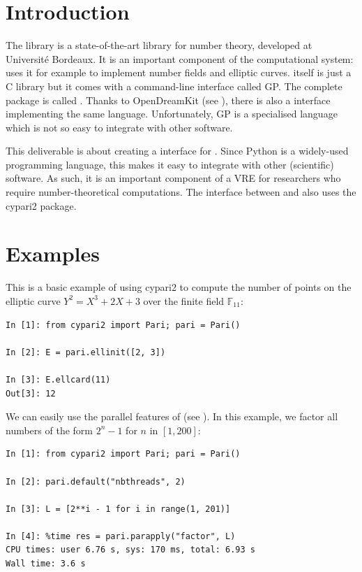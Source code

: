 \documentclass{deliverablereport}
\author{Jeroen Demeyer}
\begin{document}
\maketitle
\tableofcontents


\section{Introduction}

The \Pari library is a state-of-the-art library for number theory,
developed at Universit\'e Bordeaux.
It is an important component of the \Sage computational system:
\Sage uses it for example to implement number fields and elliptic curves.
\Pari itself is just a C library but it comes with a command-line interface called GP.
The complete package is called \PariGP.
Thanks to OpenDreamKit (see ),
there is also a \Jupyter interface implementing the same language.
Unfortunately, GP is a specialised language which is not so easy
to integrate with other software.

This deliverable is about creating a \Python interface for \PariGP.
Since Python is a widely-used programming language,
this makes it easy to integrate \PariGP with other (scientific) software.
As such, it is an important component of a VRE
for researchers who require number-theoretical computations.
The interface between \Sage and \PariGP also uses the cypari2 package.

\clearpage
\section{Examples}

This is a basic example of using cypari2 to compute
the number of points on the elliptic curve $Y^2 = X^3 + 2X + 3$
over the finite field $\mathbb{F}_{11}$:
\begin{verbatim}
In [1]: from cypari2 import Pari; pari = Pari()

In [2]: E = pari.ellinit([2, 3])

In [3]: E.ellcard(11)
Out[3]: 12
\end{verbatim}

We can easily use the parallel features of \PariGP (see ).
In this example, we factor all numbers of the form $2^n - 1$ for $n$ in $[1, 200]$:
\begin{verbatim}
In [1]: from cypari2 import Pari; pari = Pari()

In [2]: pari.default("nbthreads", 2)

In [3]: L = [2**i - 1 for i in range(1, 201)]

In [4]: %time res = pari.parapply("factor", L)
CPU times: user 6.76 s, sys: 170 ms, total: 6.93 s
Wall time: 3.6 s
\end{verbatim}
\end{document}
